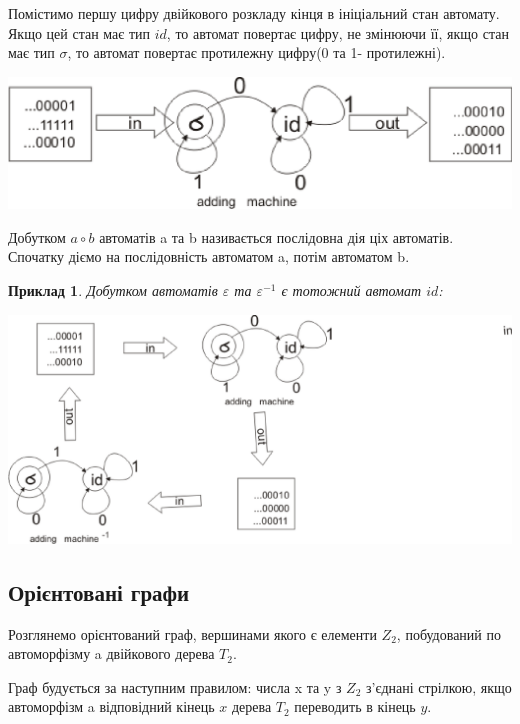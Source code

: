 \documentclass[a4paper,12pt]{article} \usepackage{a4wide}
\numberwithin{equation}{subsection}
\newtheorem{example}{Приклад}[subsection]
\begin{document}
 Помістимо
першу цифру двійкового розкладу кінця в ініціальний стан автомату.
Якщо цей стан має тип $id$, то автомат повертає цифру, не змінюючи
 її, якщо стан має тип $\sigma$, то  автомат повертає протилежну цифру(0 та 1- протилежні).
 \begin{center}
\includegraphics[scale=0.8]{Autwork.eps}
\end{center}
Добутком $a\circ b$ автоматів a та b називається послідовна дія ціх автоматів.
 Спочатку діємо на послідовність автоматом a, потім автоматом b.
\begin{example}
Добутком автоматів $\varepsilon$ та $\varepsilon^{-1}$ є тотожний автомат $id$:
\begin{center}
\includegraphics[scale=0.8]{MultAutwork.eps}
\end{center}
\end{example}




\subsection{Орієнтовані графи}


Розглянемо орієнтований граф, вершинами якого є елементи $Z_2$, побудований по автоморфізму a двійкового дерева $T_2$.

Граф будується за наступним правилом: числа x та y з $Z_2$ з'єднані стрілкою, якщо автоморфізм a відповідний кінець $x$ дерева $T_2$ переводить в кінець $y$.
\end{document}
